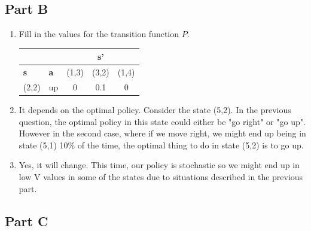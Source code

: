 \documentclass{article}
\begin{document}
\subsection{Part B}

\begin{enumerate}[label=(\alph*)]
\item Fill in the values for the transition function $P$.\\
    \begin{center}
    \begin{tabular}{|l|l|c|c|c|}\hline
      \multicolumn{2}{|c|}{} &
                               \multicolumn{3}{|c|}{\textbf{s'}}\\\hline
      \textbf{s} & \textbf{a} & (1,3) & (3,2) & (1,4)\\\hline
      (2,2) & up & 0 & 0.1 & 0 \\ \hline
    \end{tabular}
  \end{center}

\item It depends on the optimal policy. Consider the state (5,2). In the previous question, the optimal policy in this state could either be "go right" or "go up". However in the second case, where if we move right, we might end up being in state (5,1) 10\% of the time, the optimal thing to do in state (5,2) is to go up.  
  
\item Yes, it will change. This time, our policy is stochastic so we might end up in low V values in some of the states due to situations described in the previous part.
\end{enumerate}

\subsection{Part C}
\end{document}
